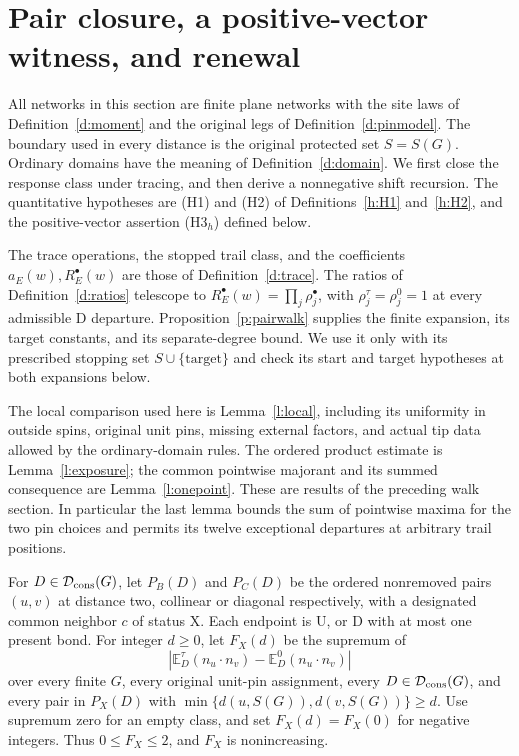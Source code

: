 \section{Pair closure, a positive-vector witness, and renewal}
\label{s:recursion}

All networks in this section are finite plane networks with the site
laws of Definition~\ref{d:moment} and the original legs of
Definition~\ref{d:pinmodel}.  The boundary used in every distance is
the original protected set \(S=S(G)\).  Ordinary domains have the
meaning of Definition~\ref{d:domain}.  We first close the response
class under tracing, and then derive a nonnegative shift recursion.
The quantitative hypotheses are (H1) and (H2) of
Definitions~\ref{h:H1} and~\ref{h:H2}, and the positive-vector
assertion (H3\(_h\)) defined below.

The trace operations, the stopped trail class, and the coefficients
\(a_E(w),R_E^\bullet(w)\) are those of
Definition~\ref{d:trace}.  The ratios of
Definition~\ref{d:ratios} telescope to
\(R_E^\bullet(w)=\prod_j\rho_j^\bullet\), with
\(\rho_j^\tau=\rho_j^0=1\) at every admissible
\(\mathrm D\) departure.  Proposition~\ref{p:pairwalk} supplies
the finite expansion, its target constants, and its separate-degree
bound.  We use it only with its prescribed stopping set
\(S\cup\{\text{target}\}\) and check its start and target
hypotheses at both expansions below.

The local comparison used here is Lemma~\ref{l:local}, including
its uniformity in outside spins, original unit pins, missing
external factors, and actual tip data allowed by the ordinary-domain
rules.  The ordered product estimate is Lemma~\ref{l:exposure};
the common pointwise majorant and its summed consequence are
Lemma~\ref{l:onepoint}.  These are results of the preceding walk
section.  In particular the last lemma bounds the sum of pointwise
maxima for the two pin choices and permits its twelve exceptional
departures at arbitrary trail positions.

\begin{definition}\label{d:pairenv}
For \(D\in\mathcal D_{\rm cons}(G)\), let \(P_B(D)\) and \(P_C(D)\)
be the ordered nonremoved pairs \((u,v)\) at distance two,
collinear or diagonal respectively, with a designated common neighbor
\(c\) of status \(\mathrm X\). Each endpoint is \(\mathrm U\),
or \(\mathrm D\) with at most one present bond.
For integer \(d\ge0\), let \(F_X(d)\) be the supremum of
\[
 \left|\mathbb E_D^\tau(n_u\cdot n_v)
                    -\mathbb E_D^0(n_u\cdot n_v)\right|
\]
over every finite \(G\), every original unit-pin assignment,
every \(D\in\mathcal D_{\rm cons}(G)\), and every pair in \(P_X(D)\)
with \(\min\{d(u,S(G)),d(v,S(G))\}\ge d\).
Use supremum zero for an empty class, and set \(F_X(d)=F_X(0)\)
for negative integers. Thus \(0\le F_X\le2\), and \(F_X\)
is nonincreasing.
\end{definition}

